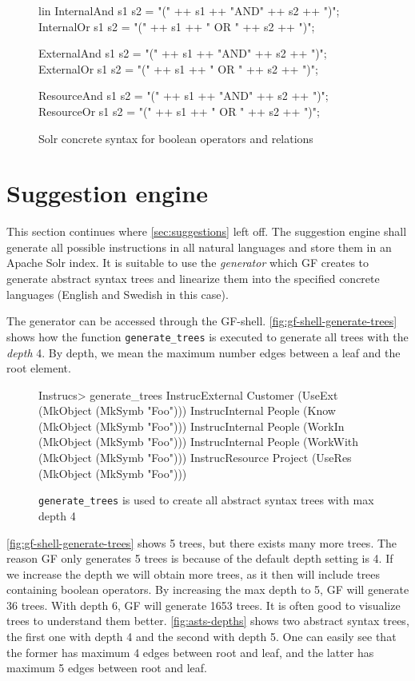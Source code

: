 \begin{figure}[H]
\begin{code}
lin
  InternalAnd s1 s2 = "(" ++ s1 ++ "AND" ++ s2 ++ ")";
  InternalOr s1 s2 = "(" ++ s1 ++ " OR " ++ s2 ++ ")";

  ExternalAnd s1 s2 = "(" ++ s1 ++ "AND" ++ s2 ++ ")";
  ExternalOr s1 s2 = "(" ++ s1 ++ " OR " ++ s2 ++ ")";

  ResourceAnd s1 s2 = "(" ++ s1 ++ "AND" ++ s2 ++ ")";
  ResourceOr s1 s2 = "(" ++ s1 ++ " OR " ++ s2 ++ ")";
\end{code}
\caption{Solr concrete syntax for boolean operators and relations\label{fig:boolean-solr-relations}}
\end{figure}

\section{Suggestion engine}
This section continues where \autoref{sec:suggestions} left off. The suggestion engine shall generate all possible instructions in all natural languages and store them in an Apache Solr index. It is suitable to use the \emph{generator} which GF creates to generate abstract syntax trees and linearize them into the specified concrete languages (English and Swedish in this case).

The generator can be accessed through the GF-shell.  \autoref{fig:gf-shell-generate-trees} shows how the function \texttt{generate\_trees} is executed to generate all trees with the \emph{depth} 4. By depth, we mean the maximum number edges between a leaf and the root element.

\begin{figure}[H]
\begin{terminal}
Instrucs> generate_trees
InstrucExternal Customer (UseExt (MkObject (MkSymb "Foo")))
InstrucInternal People (Know (MkObject (MkSymb "Foo")))
InstrucInternal People (WorkIn (MkObject (MkSymb "Foo")))
InstrucInternal People (WorkWith (MkObject (MkSymb "Foo")))
InstrucResource Project (UseRes (MkObject (MkSymb "Foo")))
\end{terminal}
\caption{\texttt{generate\_trees} is used to create all abstract syntax trees with max depth 4\label{fig:gf-shell-generate-trees}}
\end{figure}

\autoref{fig:gf-shell-generate-trees} shows 5 trees, but there exists many more trees. The reason GF only generates 5 trees is because of the default depth setting is 4. If we increase the depth we will obtain more trees, as it then will include trees containing boolean operators. By increasing the max depth to 5, GF will generate 36 trees. With depth 6, GF will generate 1653 trees.
\newline
\newline
It is often good to visualize trees to understand them better. \autoref{fig:asts-depths} shows two abstract syntax trees, the first one with depth 4 and the second with depth 5. One can easily see that the former has maximum 4 edges between root and leaf, and the latter has maximum 5 edges between root and leaf.

